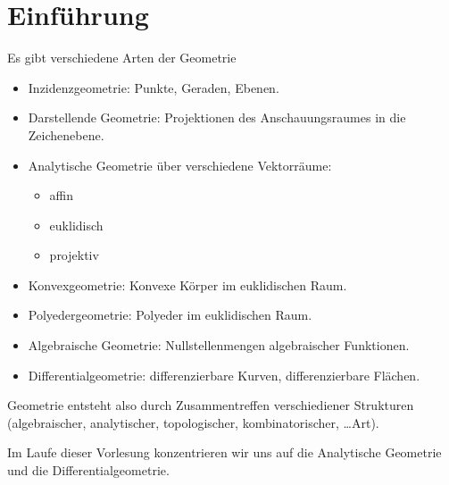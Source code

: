 \chapter{Einführung}



Es gibt verschiedene Arten der Geometrie

\begin{itemize}
	\item
		Inzidenzgeometrie: Punkte, Geraden, Ebenen.
	\item
		Darstellende Geometrie: Projektionen des Anschauungsraumes in die Zeichenebene.
	\item
		Analytische Geometrie über verschiedene Vektorräume:
		\begin{itemize}
			\item
				affin
			\item
				euklidisch
			\item
				projektiv
		\end{itemize}
	\item
		Konvexgeometrie: Konvexe Körper im euklidischen Raum.
	\item
		Polyedergeometrie: Polyeder im euklidischen Raum.
	\item
		Algebraische Geometrie: Nullstellenmengen algebraischer Funktionen.
	\item
		Differentialgeometrie: differenzierbare Kurven, differenzierbare Flächen.
\end{itemize}
Geometrie entsteht also durch Zusammentreffen verschiediener Strukturen (algebraischer, analytischer, topologischer, kombinatorischer, \dots Art).

Im Laufe dieser Vorlesung konzentrieren wir uns auf die Analytische Geometrie und die Differentialgeometrie.


